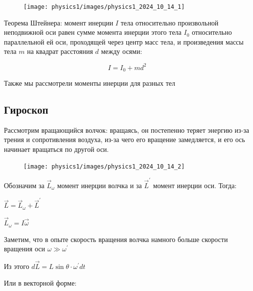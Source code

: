 \documentclass[12pt]{article}
\begin{document}
    \smallvspace
    
    \begin{minipage}{\textwidth}
        \begin{figure}
            \texttt{[image: physics1/images/physics1\_2024\_10\_14\_1]}
        \end{figure}

        Теорема Штейнера: момент инерции $I$ тела относительно произвольной неподвижной оси равен сумме момента инерции этого тела 
        $I_0$ относительно параллельной ей оси, проходящей через центр масс тела, и произведения массы тела $m$ на квадрат расстояния 
        $d$ между осями:

        \[I = I_0 + md^2\]

        Также мы рассмотрели моменты инерции для разных тел

        \subsection{Гироскоп}

        Рассмотрим вращающийся волчок: вращаясь, он постепенно теряет энергию из-за трения и сопротивления воздуха, из-за чего
        его вращение замедляется, и его ось начинает вращаться по другой оси. 
    \end{minipage}
        
    \begin{minipage}{\textwidth}
        \begin{figure}
            \texttt{[image: physics1/images/physics1\_2024\_10\_14\_2]}
        \end{figure}
        
        Обозначим за $\vec{L}_\omega$ момент инерции 
        волчка и за $\vec{L}^\prime$ момент инерции оси. Тогда:
        
        $\vec{L} = \vec{L}_\omega + \vec{L}^\prime$

        $\vec{L}_\omega = I \vec{\omega}$

        Заметим, что в опыте скорость вращения волчка намного больше скорости вращения оси $\omega \gg \omega^\prime$

        Из этого $d\vec{L} = L \sin\theta \cdot \omega^\prime dt$

    \end{minipage}
    
    \smallvspace

    Или в векторной форме:
\end{document}
